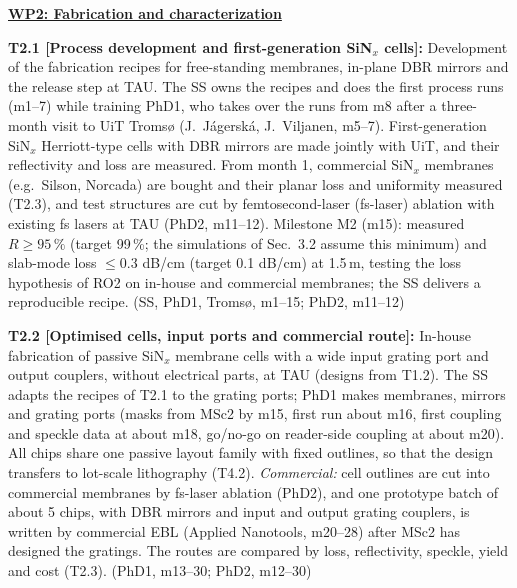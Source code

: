 \documentclass[a4paper,12pt]{article}
\newcommand{\wc}[1]{\textcolor{dkmaroon}{#1}} %
\newcommand{\nc}[1]{\textcolor{dkleaf}{#1}} %
\begin{document}
\underline{\textbf{WP2: Fabrication and characterization}}

\textbf{T2.1 [Process development and first-generation SiN$_x$ cells]:} Development of the fabrication recipes for free-standing membranes, in-plane DBR mirrors and the release step at TAU. The SS owns the recipes and \nc{does the first process runs (m\nc{1--7}) while training PhD1, who takes over the runs from m\nc{8} after} a three-month visit to UiT Tromsø (J.~J\'agersk\'a, J.~Viljanen, m\nc{5--7}). First-generation SiN$_x$ Herriott-type cells with DBR mirrors are made jointly with UiT, and their reflectivity and loss are measured. From month 1, commercial SiN$_x$ membranes (e.g.\ Silson, Norcada) are bought and their planar loss and uniformity measured (T2.3), and test structures are cut by femtosecond-laser (fs-laser) ablation with existing fs lasers at TAU (PhD2, m11--12). Milestone M2 (m15): measured $R\geq 95\,\%$ (target 99\,\%\wc{; the simulations of Sec.~3.2 assume this minimum}) and slab-mode loss $\leq0.3$ dB/cm (target 0.1 dB/cm) at 1.5\,\textmu{}m, testing the loss hypothesis of RO2 on in-house and commercial membranes; the SS delivers a reproducible recipe. (SS, PhD1, Troms\o{}, m1--15; PhD2, m11--12)

\textbf{T2.2 [Optimised cells, \nc{input ports} and commercial route]:} In-house fabrication of \nc{passive} SiN$_x$ membrane cells with \nc{a wide input grating port and output couplers, without electrical parts,} at TAU (designs from T1.2). The SS adapts the recipes of T2.1 \nc{to the grating ports}; PhD1 makes membranes, mirrors \nc{and grating ports} (masks from MSc2 by m15, first run about m16, \nc{first coupling and speckle data at about m18, go/no-go on reader-side coupling at about m20}). \nc{All chips share one passive layout family with fixed outlines, so that the design transfers to lot-scale lithography (T4.2).} \emph{Commercial:} cell outlines are cut into commercial membranes by fs-laser ablation (PhD2), and one prototype batch of about 5 chips, with DBR mirrors and input and output grating couplers, is written by commercial EBL (Applied Nanotools, m20--28) after \nc{MSc2} has designed the gratings. The routes are compared by loss, reflectivity, speckle, yield and cost (T2.3). (PhD1, m13--30; PhD2, m12--30)
\end{document}
